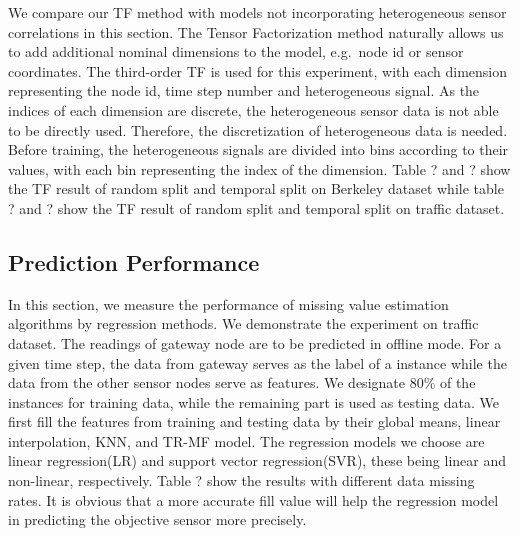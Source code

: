 We compare our TF method with models not incorporating heterogeneous sensor correlations in this section.
The Tensor Factorization method naturally allows us to add additional nominal dimensions to the model, e.g.\ node id or sensor coordinates.
The third-order TF is used for this experiment, with each dimension representing the node id, time step number and heterogeneous signal.  
As the indices of each dimension are discrete, the heterogeneous sensor data is not able to be directly used.
Therefore, the discretization of heterogeneous data is needed.
Before training, the heterogeneous signals are divided into bins according to their values, with each bin representing the index of the dimension.
Table ? and ? show the TF result of random split and temporal split on Berkeley dataset while table ? and ? show the TF result of random split and temporal split on traffic dataset.

\subsection{Prediction Performance}
In this section, we measure the performance of missing value estimation algorithms by regression methods.
We demonstrate the experiment on traffic dataset.
The readings of gateway node are to be predicted in offline mode.
For a given time step, the data from gateway serves as the label of a instance while the data from the other sensor nodes serve as features.
We designate 80\% of the instances for training data, while the remaining part is used as testing data.
We first fill the features from training and testing data by their global means, linear interpolation, KNN, and TR-MF model.
The regression models we choose are linear regression(LR) and support vector regression(SVR), these being linear and non-linear, respectively.
Table ? show the results with different data missing rates.
It is obvious that a more accurate fill value will help the regression model in predicting the objective sensor more precisely.

